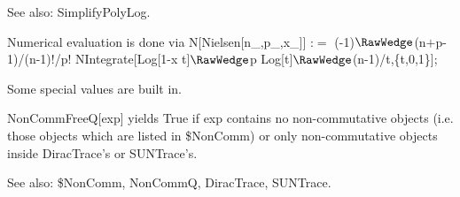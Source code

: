 

See also:  SimplifyPolyLog.




Numerical evaluation is done via N[Nielsen[n\_{},p\_{},x\_{}]] :\(=\) (-1)\(\RawWedge\)(n\(+\)p-1)/(n-1)!/p! NIntegrate[Log[1-x
  t]\(\RawWedge\)p Log[t]\(\RawWedge\)(n-1)/t,\{t,0,1\}];



Some special values are built in.











NonCommFreeQ[exp] yields True if exp contains no non-commutative objects (i.e. those objects which are listed in \${}NonComm) or only
  non-commutative objects inside DiracTrace's or SUNTrace's.

See also:  \${}NonComm, NonCommQ, DiracTrace, SUNTrace.

